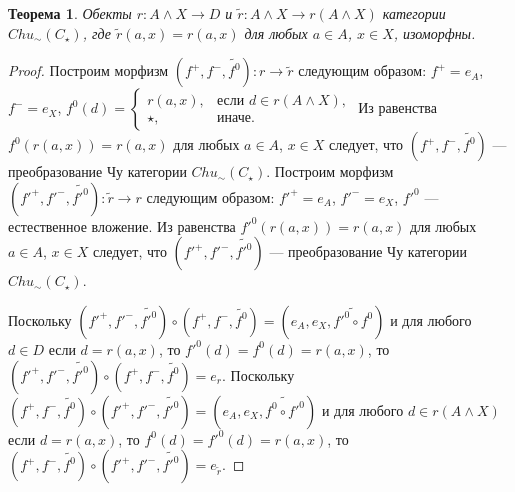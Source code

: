 \documentclass[a4paper,12pt]{article}
\newtheorem{theorem}{Теорема}
\begin{document}
\begin{theorem}\label{iso-c}
    Обекты $r: A \wedge X \to D$ и $\tilde{r}: A \wedge X \to r(A \wedge X)$ категории $Chu_\sim(C_\star)$, где $\tilde{r}(a,x) = r(a,x)$ для любых $a \in A$, $x \in X$, изоморфны.
\end{theorem}
\begin{proof}
    Построим морфизм $(f^+,f^-,\widetilde{f^0}): r \to \tilde{r}$ следующим образом: $f^+ = e_A$, $f^- = e_X$, $f^0(d) = 
    \begin{cases}
        r(a,x),& \text{если } d \in r(A \wedge X),\\
        \star,& \text{иначе}.
    \end{cases}$
    Из равенства $f^0(r(a,x)) = r(a,x)$ для любых $a \in A$, $x \in X$ следует, что $(f^+,f^-,\widetilde{f^0})$ --- преобразование Чу категории $Chu_\sim(C_\star)$. Построим морфизм $(f'^+,f'^-,\widetilde{f'^0}): \tilde{r} \to r$ следующим образом: $f'^+ = e_A$, $f'^- = e_X$, $f'^0$ --- естественное вложение. Из равенства $f'^0(r(a,x)) = r(a,x)$ для любых $a \in A$, $x \in X$ следует, что $(f'^+,f'^-,\widetilde{f'^0})$ --- преобразование Чу категории $Chu_\sim(C_\star)$.

    Поскольку $(f'^+,f'^-,\widetilde{f'^0}) \circ (f^+,f^-,\widetilde{f^0}) = (e_A,e_X,\widetilde{f'^0 \circ f^0})$ и для любого $d \in D$ если $d = r(a,x)$, то $f'^0(d) = f^0(d) = r(a,x)$, то $(f'^+,f'^-,\widetilde{f'^0}) \circ (f^+,f^-,\widetilde{f^0}) = e_r$. Поскольку $(f^+,f^-,\widetilde{f^0}) \circ (f'^+,f'^-,\widetilde{f'^0}) = (e_A,e_X,\widetilde{f^0 \circ f'^0})$ и для любого $d \in r(A \wedge X)$ если $d = r(a,x)$, то $f^0(d) = f'^0(d) = r(a,x)$, то $(f^+,f^-,\widetilde{f^0}) \circ (f'^+,f'^-,\widetilde{f'^0}) = e_{\tilde{r}}$.
\end{proof}
\end{document}
